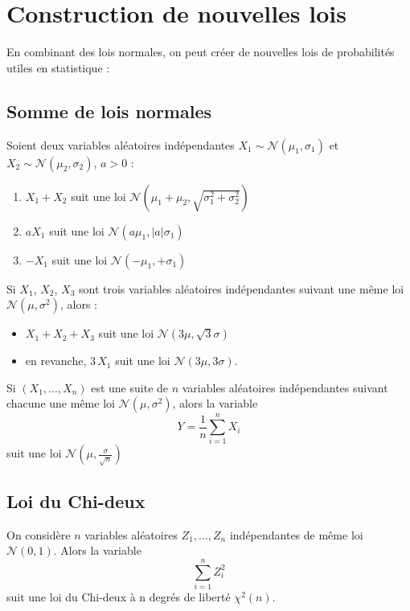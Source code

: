 \section{Construction de nouvelles lois}

En combinant des lois normales, on peut créer de nouvelles lois de probabilités utiles en statistique :

\subsection{Somme de lois normales}

\begin{proposition}{}{}
	Soient deux variables aléatoires indépendantes $X_1 \sim \mathcal{N}(\mu_1,\sigma_1)$ et $X_2 \sim \mathcal{N}(\mu_2,\sigma_2)$, $a>0$ :
	\begin{enumerate}
		\item $X_1+X_2$ suit une loi $\mathcal{N}(\mu_1+\mu_2,\sqrt{\sigma_1^2+\sigma_2^2})$
		\item $aX_1$ suit une loi $\mathcal{N}(a\mu_1,|a|\sigma_1)$
		\item $-X_1$ suit une loi $\mathcal{N}(-\mu_1,+\sigma_1)$
		
	\end{enumerate}
	
\end{proposition}

\begin{exemple}{}{}
	Si $X_1$, $X_2$, $X_3$ sont trois variables aléatoires indépendantes suivant une même loi $\mathcal{N}(\mu,\sigma^2)$, alors : 
	\begin{itemize}
		\item 	$X_1+X_2+X_3$ suit une loi $\mathcal{N}(3\mu,\sqrt{3}\sigma)$
		\item en revanche, $3 \, X_1$ suit une loi $\mathcal{N}(3\mu,3\sigma)$.
	\end{itemize}
\end{exemple}

\begin{exemple}{}{}
	Si $(X_1,...,X_n)$ est une suite de $n$ variables aléatoires indépendantes suivant chacune une même loi $\mathcal{N}(\mu,\sigma^2)$, alors la variable $$Y=\frac{1}{n}\sum_{i=1}^n X_i$$ suit une loi $\mathcal{N}(\mu,\frac{\sigma}{\sqrt{n}})$
\end{exemple}



\subsection{Loi du Chi-deux}
\begin{definition}{}{}
	On considère $n$ variables aléatoires $Z_1,...,Z_n$ indépendantes de même loi  $\mathcal{N}(0,1)$. Alors la variable $$\sum_{i=1}^n Z_i^2$$ suit une loi du Chi-deux à n degrés de liberté $\chi^2(n)$.
\end{definition}

